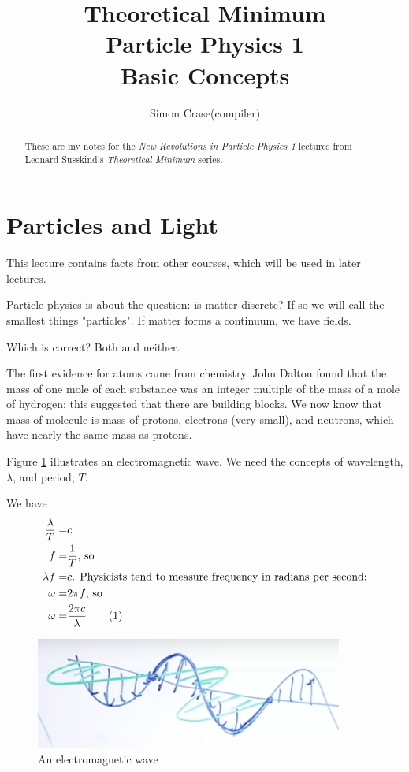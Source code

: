\documentclass[]{article}
\title{Theoretical Minimum\\Particle Physics 1\\Basic Concepts}
\author{Simon Crase(compiler)}
\newcommand\numberthis{\addtocounter{equation}{1}\tag{\theequation}}
\begin{document}
\maketitle

\begin{abstract}
These are my notes for the \emph{New Revolutions in Particle Physics 1} lectures\cite{susskind2009particles} from Leonard Susskind's \emph{Theoretical Minimum} series\cite{susskind2007theoretical}.
\end{abstract}

\tableofcontents
\listoffigures
\listoftables
\listoftheorems

\section{Particles and Light}

This lecture contains  facts from other courses, which will be used in later lectures.

Particle physics is about the question: is matter discrete? If so we will call the smallest things "particles". If matter forms a continuum, we have fields.

Which is correct? Both and neither.

The first evidence for atoms came from chemistry. John Dalton found that the mass of one mole of each substance was an integer multiple of the mass of a mole of hydrogen; this suggested that there are building blocks. We now know that mass of molecule is mass of protons, electrons (very small), and neutrons, which have nearly the same mass as protons. 
 
Figure \ref{fig:em:wave} illustrates an electromagnetic wave. We need the concepts of wavelength, $\lambda$, and period, $T$.

We have
\begin{align*}
\frac{\lambda}{T}=&c\\
f=&\frac{1}{T} \text{, so}\\
\lambda f =& c\text{. Physicists tend to measure frequency in radians per second:}\\
\omega =& 2 \pi f \text{, so} \\
\omega =& \frac{2 \pi c}{\lambda} \numberthis \label{eq:omega:lambda}
\end{align*}

\begin{figure}[H]
	\caption{An electromagnetic wave}\label{fig:em:wave}  
	\includegraphics[width=0.9\textwidth]{Wavelength}
\end{figure}
\end{document}
